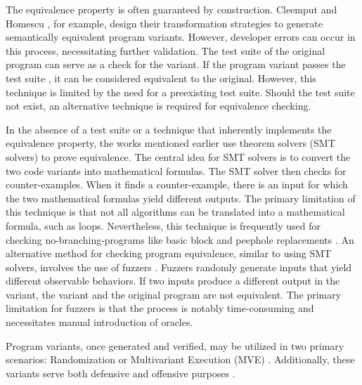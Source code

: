  The equivalence property is often guaranteed by construction. 
Cleemput \etal \cite{Cleemput2012} and Homescu \etal \cite{homescu2013profile}, for example, design their transformation strategies to generate semantically equivalent program variants. 
However, developer errors can occur in this process, necessitating further validation. 
The test suite of the original program can serve as a check for the variant. 
If the program variant passes the test suite \cite{harrand2020java}, it can be considered equivalent to the original. 
However, this technique is limited by the need for a preexisting test suite. 
Should the test suite not exist, an alternative technique is required for equivalence checking.

 In the absence of a test suite or a technique that inherently implements the equivalence property, the works mentioned earlier use theorem solvers (SMT solvers) \cite{SMT_solver} to prove equivalence. 
The central idea for SMT solvers is to convert the two code variants into mathematical formulas. 
The SMT solver then checks for counter-examples. When it finds a counter-example, there is an input for which the two mathematical formulas yield different outputs. 
The primary limitation of this technique is that not all algorithms can be translated into a mathematical formula, such as loops. 
Nevertheless, this technique is frequently used for checking no-branching-programs like basic block and peephole replacements \cite{SuperoptimizationScaling}.
An alternative method for checking program equivalence, similar to using SMT solvers, involves the use of fuzzers \cite{zalewski2017american}.
Fuzzers randomly generate inputs that yield different observable behaviors. 
If two inputs produce a different output in the variant, the variant and the original program are not equivalent. 
The primary limitation for fuzzers is that the process is notably time-consuming and necessitates manual introduction of oracles.



Program variants, once generated and verified, may be utilized in two primary scenarios: Randomization or Multivariant Execution (MVE) \cite{jackson}. 
Additionally, these variants serve both defensive and offensive purposes \cite{offensive_div}.


